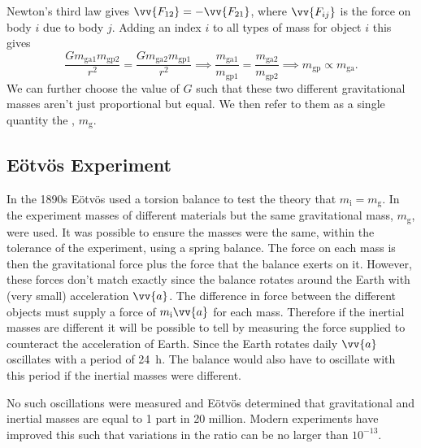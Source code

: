 \documentclass[fleqn]{NotesClass}
\begin{document}
    Newton's third law gives \(\vv{F_{12}} = -\vv{F_{21}}\), where \(\vv{F_{ij}}\) is the force on body \(i\) due to body \(j\).
    Adding an index \(i\) to all types of mass for object \(i\) this gives
    \begin{equation}
        \frac{Gm_{\mathrm{ga1}}m_{\mathrm{gp2}}}{r^2} = \frac{Gm_{\mathrm{ga2}}m_{\mathrm{gp1}}}{r^2} \implies \frac{m_{\mathrm{ga1}}}{m_{\mathrm{gp1}}} = \frac{m_{\mathrm{ga2}}}{m_{\mathrm{gp2}}} \implies m_{\mathrm{gp}} \propto m_{\mathrm{ga}}.
    \end{equation}
    We can further choose the value of \(G\) such that these two different gravitational masses aren't just proportional but equal.
    We then refer to them as a single quantity the , \(m_{\mathrm{g}}\).
    
    \subsection{E\"otv\"os Experiment}
    In the 1890s E\"otv\"os used a torsion balance to test the theory that \(m_{\mathrm{i}} = m_{\mathrm{g}}\).
    In the experiment masses of different materials but the same gravitational mass, \(m_{\mathrm{g}}\), were used.
    It was possible to ensure the masses were the same, within the tolerance of the experiment, using a spring balance.
    The force on each mass is then the gravitational force plus the force that the balance exerts on it.
    However, these forces don't match exactly since the balance rotates around the Earth with (very small) acceleration \(\vv{a}\).
    The difference in force between the different objects must supply a force of \(m_{\mathrm{i}}\vv{a}\) for each mass.
    Therefore if the inertial masses are different it will be possible to tell by measuring the force supplied to counteract the acceleration of Earth.
    Since the Earth rotates daily \(\vv{a}\) oscillates with a period of \qty{24}{\hour}.
    The balance would also have to oscillate with this period if the inertial masses were different.
    
    No such oscillations were measured and E\"otv\"os determined that gravitational and inertial masses are equal to 1 part in 20 million.
    Modern experiments have improved this such that variations in the ratio can be no larger than \(10^{-13}\).
    
\end{document}
